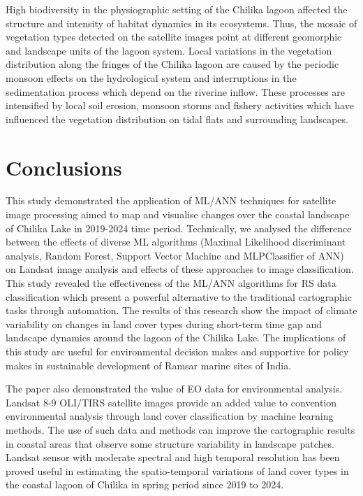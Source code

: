 \documentclass[jmse,article,submit,pdftex,moreauthors]{Definitions/mdpi}
\begin{document}
High biodiversity in the physiographic setting of the Chilika lagoon affected the structure and intensity of habitat dynamics in its ecosystems. Thus, the mosaic of vegetation types detected on the satellite images point at different geomorphic and landscape units of the lagoon system. Local variations in the vegetation distribution along the fringes of the Chilika lagoon are caused by the periodic monsoon effects on the hydrological system and interruptions in the sedimentation process which depend on the riverine inflow. These processes are intensified by local soil erosion, monsoon storms and fishery activities which have influenced the vegetation distribution on tidal flats and surrounding landscapes.

\section{Conclusions}

This study demonstrated the application of ML/ANN techniques for satellite image processing aimed to map and visualise changes over the coastal landscape of Chilika Lake in 2019-2024 time period. Technically, we analysed the difference between the effects of diverse ML algorithms (Maximal Likelihood discriminant analysis, Random Forest, Support Vector Machine and MLPClassifier of ANN) on Landsat image analysis and effects of these approaches to image classification. This study revealed the effectiveness of the ML/ANN algorithms for RS data classification which present a powerful alternative to the traditional cartographic tasks through automation. The results of this research show the impact of climate variability on changes in land cover types during short-term time gap and landscape dynamics around the lagoon of the Chilika Lake. The implications of this study are useful for environmental decision makes and supportive for policy makes in sustainable development of Ramsar marine sites of India.

The paper also demonstrated the value of EO data for environmental analysis. Landsat 8-9 OLI/TIRS satellite images provide an added value to convention environmental analysis through land cover classification by machine learning methods. The use of such data and methods can improve the cartographic results in coastal areas that observe some structure variability in landscape patches. Landsat sensor with moderate spectral and high temporal resolution has been proved useful in estimating the spatio-temporal variations of land cover types in the coastal lagoon of Chilika in spring period since 2019 to 2024. 
\end{document}
